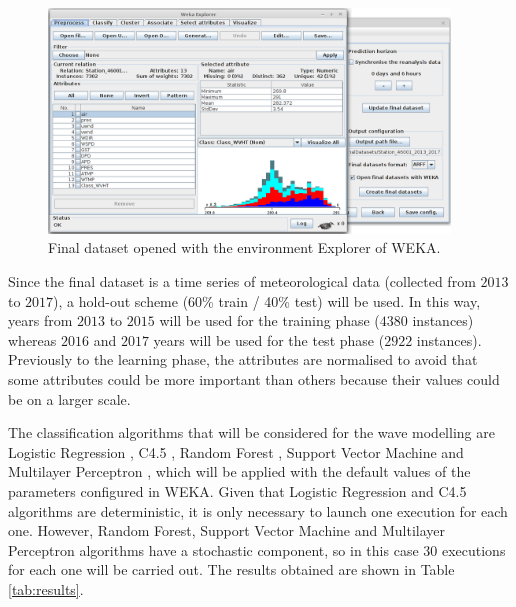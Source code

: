 \documentclass[review]{elsarticle}
\begin{document}
			\begin{figure}[ht!]
				\centering
				\includegraphics[width=0.95\textwidth]{figures/FigureOpeningFinalDatasetWeka.png}
				\caption{Final dataset opened with the environment Explorer of WEKA.}
				\label{fig:openigFinalDatasetWeka}
			\end{figure}
			
			Since the final dataset is a time series of meteorological data (collected from $2013$ to $2017$), a hold-out scheme (60\% train / 40\% test) will be used. In this way, years from $2013$ to $2015$ will be used for the training phase ($4380$ instances) whereas $2016$ and $2017$ years will be used for the test phase ($2922$ instances). Previously to the learning phase, the attributes are normalised to avoid that some attributes could be more important than others because their values could be on a larger scale.
			
			The classification algorithms that will be considered for the wave modelling are Logistic Regression \cite{hosmer2013applied}, C4.5 \cite{quinlan2014c4}, Random Forest \cite{breiman2001random}, Support Vector Machine \cite{cortes1995support} and Multilayer Perceptron \cite{haykin1994neural}, which will be applied with the default values of the parameters configured in WEKA. Given that Logistic Regression and C4.5 algorithms are deterministic, it is only necessary to launch one execution for each one. However, Random Forest, Support Vector Machine and Multilayer Perceptron algorithms have a stochastic component, so in this case 30 executions for each one will be carried out. The results obtained are shown in Table \ref{tab:results}.
			
\end{document}
